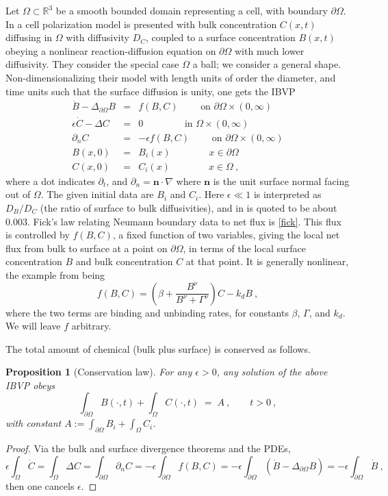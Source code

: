 \documentclass[10pt]{article}
\newcommand{\be}{\begin{equation}}
\newcommand{\ee}{\end{equation}}
\newcommand{\bea}{\begin{eqnarray}}
\newcommand{\eea}{\end{eqnarray}}
\newcommand{\mbf}[1]{{\mathbf #1}}
\newcommand{\R}{\mathbb{R}}
\newcommand{\qqquad}{\qquad\qquad}
\newtheorem{pro}[thm]{Proposition}
\newcommand{\pO}{{\partial\Omega}}
\newcommand{\LpO}{\Delta_\pO}
\newcommand{\eps}{\epsilon}
\newcommand{\dn}{\partial_n}
\begin{document}
Let $\Omega \subset \R^3$ be a smooth bounded domain
representing a cell, with boundary $\pO$.
In \cite{diegmiller18} a cell polarization model is presented
with bulk concentration $C(x,t)$ diffusing in $\Omega$ with
diffusivity $D_C$,
coupled to a surface concentration $B(x,t)$ obeying a nonlinear
reaction-diffusion equation on $\pO$ with much lower diffusivity.
They consider the special case $\Omega$ a ball; we consider a general shape.
Non-dimensionalizing their model with length units of order the diameter,
and time units such that the surface diffusion is unity,
one gets the IBVP
\bea
\dot{B} - \LpO B   &=&  f(B,C)  \qquad \mbox{ on } \pO \times (0,\infty)
\label{surfpde}
\\
\eps \dot{C} - \Delta C   &=& 0   \qqquad \mbox{ in } \Omega \times (0,\infty)
\label{pde}
\\
\dn C  &=& -\eps f(B,C) \qquad \mbox{ on } \pO \times (0,\infty)
\label{fick}
\\
B(x,0) &=& B_i(x)  \qqquad x\in\pO
\label{Bi}
\\
C(x,0) &=& C_i(x)  \qqquad x\in\Omega ~,
\label{Ci}
\eea
where a dot indicates $\partial_t$, and $\dn = \mbf{n}\cdot\nabla$
where $\mbf{n}$ is the unit surface normal facing out of $\Omega$.
The given initial data are $B_i$ and $C_i$.
Here $\eps \ll 1$ is interpreted as $D_B/D_C$ (the ratio of surface
to bulk diffusivities), and in \cite{diegmiller18} is quoted to be about
$0.003$.
Fick's law relating Neumann boundary data to net flux is \eqref{fick}.
This flux is controlled by $f(B,C)$, a fixed function of two variables,
giving the local net flux from bulk to surface at a point on $\pO$, in terms of the local surface concentration $B$ and bulk concentration $C$ at that point.
It is generally nonlinear, the example from \cite{diegmiller18} being
$$
f(B,C) = (\beta + \frac{B^\nu}{B^\nu + \Gamma^\nu})C - k_d B~,
$$
where the two terms are binding and unbinding rates,
for constants $\beta$, $\Gamma$, and $k_d$. We will leave $f$ arbitrary.

The total amount of chemical (bulk plus surface) is conserved as follows.
\begin{pro}[Conservation law]
  For any $\eps>0$,
  any solution of the above IBVP obeys
  \be
\int_\pO B(\cdot,t) + \int_\Omega C(\cdot,t) \; = \; A ~,  \qquad t>0~,
\label{cons}
\ee
with constant $A:=\int_\pO B_i + \int_\Omega C_i$.
\label{p:cons}
\end{pro}
\begin{proof}
Via the bulk and surface divergence theorems and the PDEs,
$$
\eps \int_\Omega \dot{C} = \int_\Omega \Delta C = \int_\pO \dn C =  -\eps
\int_\pO f(B,C) = -\eps \int_\pO (\dot{B}-\LpO B) = -\eps \int_\pO \dot{B}~,
$$
then one cancels $\eps$.
\end{proof}
\end{document}

